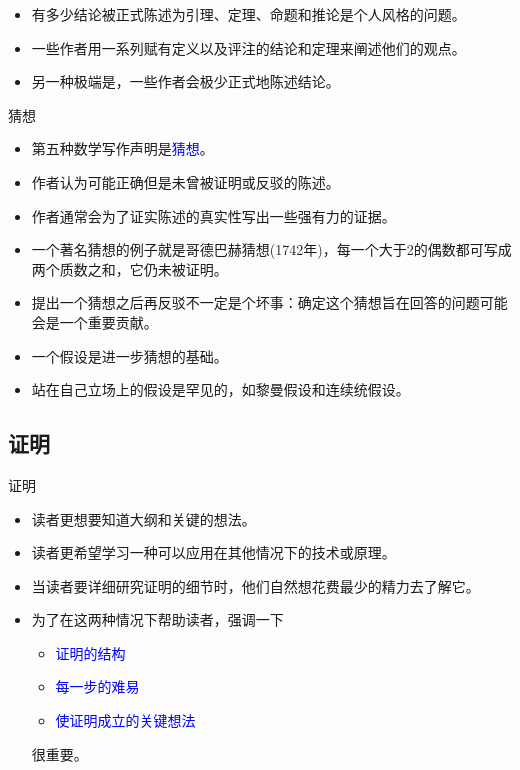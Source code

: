 \documentclass[13pt]{ctexbeamer}
\newcommand{\blue}[1]{\textcolor{blue}{#1}}
\begin{document}
\begin{frame}
\begin{itemize}
\item 有多少结论被正式陈述为引理、定理、命题和推论是个人风格的问题。
\item 一些作者用一系列赋有定义以及评注的结论和定理来阐述他们的观点。
\item 另一种极端是，一些作者会极少正式地陈述结论。
\end{itemize}
\end{frame}

\begin{frame}{猜想}
\begin{itemize}
\item 第五种数学写作声明是\blue{猜想}。
\item 作者认为可能正确但是未曾被证明或反驳的陈述。
\item 作者通常会为了证实陈述的真实性写出一些强有力的证据。
\item  一个著名猜想的例子就是哥德巴赫猜想(1742年)，每一个大于2的偶数都可写成两个质数之和，它仍未被证明。
\item 提出一个猜想之后再反驳不一定是个坏事：确定这个猜想旨在回答的问题可能会是一个重要贡献。


\item 一个假设是进一步猜想的基础。
\item 站在自己立场上的假设是罕见的，如黎曼假设和连续统假设。
\end{itemize}
\end{frame}


\subsection{证明}

\begin{frame}{证明}
	\begin{itemize}
		\item 读者更想要知道大纲和关键的想法。
		\item 读者更希望学习一种可以应用在其他情况下的技术或原理。
		\item 当读者要详细研究证明的细节时，他们自然想花费最少的精力去了解它。
		\item 为了在这两种情况下帮助读者，强调一下
		\begin{itemize}
		\item \blue{证明的结构}
		\item \blue{每一步的难易}
		\item \blue{使证明成立的关键想法}
		\end{itemize}
		很重要。

	\end{itemize}
\end{frame}
\end{document}
